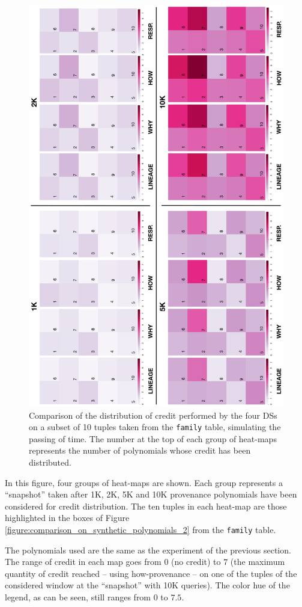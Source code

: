 \begin{figure}[h!]
\centering
  \includegraphics[width=.75\textwidth]{figures/experiments/comparison}
  \caption{Comparison of the distribution of credit performed by the four DSs on a subset of 10 tuples taken from the \texttt{family} table, simulating the passing of time. The number at the top of each group of heat-maps represents the number of polynomials whose credit has been distributed.}
  \label{fig:comparison}
\end{figure}

In this figure, four groups of heat-maps are shown. Each group represents a ``snapshot'' taken %
after 1K, 2K, 5K and 10K provenance polynomials have been considered for credit distribution.  
The ten tuples in each heat-map  %
are those  highlighted in the  boxes of Figure \ref{figure:comparison_on_synthetic_polynomials_2} from the \texttt{family} table.  


The polynomials used are the same as the experiment of the previous section. The range of credit in each map goes from 0 (no credit) to $7$ (the maximum quantity of credit reached -- using how-provenance -- on one of the tuples of the considered window at the ``snapshot'' with 10K queries). The color hue of the legend, as can be seen, still ranges from $0$ to $7.5$.

